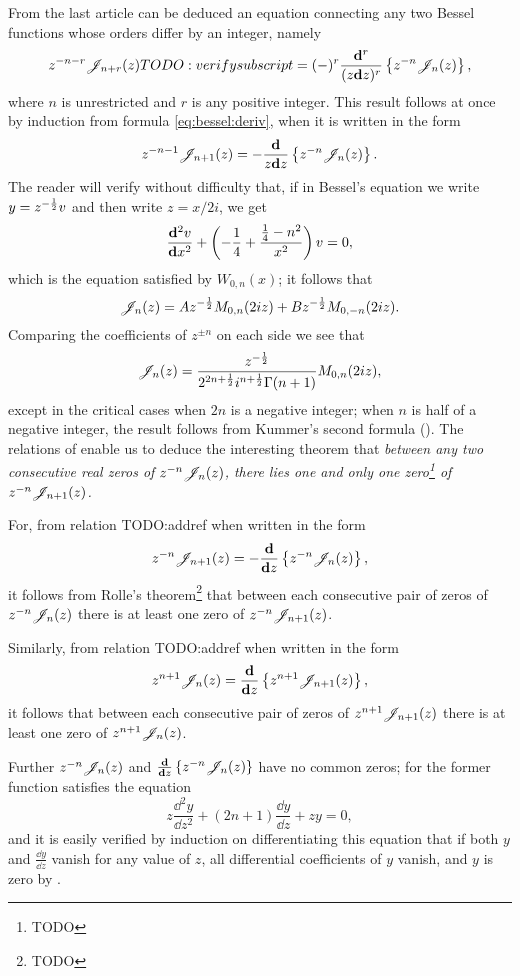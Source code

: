 From the last article can be deduced an equation connecting any two
Bessel functions whose orders differ by an integer, namely
$$
z^{-n-r} \mathscr{J}_{n+r}(z) TODO: verify subscript
=
(-)^{r}
\frac{\mathbf{d}^{r}}{ (z \mathbf{d} z)^{r} }
\left\{  z^{-n} \mathscr{J}_{n}(z)   \right\},
$$
where $n$ is unrestricted and $r$ is any positive integer. This result
follows at once by induction from formula \eqref{eq:bessel:deriv},
when it is written in the form
$$
z^{-n-1} \mathscr{J}_{n+1}(z)
=
- \frac{\mathbf{d}}{z \mathbf{d} z}
\left\{  z^{-n} \mathscr{J}_{n}(z)   \right\}.
$$
The reader will verify without difficulty that, if in Bessel's
equation we write $y = z^{-\frac{1}{2}} v$ and then write $z = x/2i$, we get
$$
\frac{\mathbf{d}^{2} v}{\mathbf{d} x^{2}}
+
\left(  -\frac{1}{4} + \frac{\frac{1}{4} - n^{2}}{x^{2}}   \right) v
=
0,
$$
which is the equation satisfied by $W_{0,n}(x)$; it follows that
$$
\mathscr{J}_{n}(z) = A z^{-\frac{1}{2}} M_{0,n}(2iz) + B z^{-\frac{1}{2}} M_{0,-n}(2iz).
$$
Comparing the coefficients of $z^{\pm n}$ on each side we see that
$$
\mathscr{J}_{n}(z) = \frac{z^{-\frac{1}{2}}}{2^{2n+\frac{1}{2}} i^{n+\frac{1}{2}} \Gamma(n+1)} M_{0,n}(2iz),
$$
%
%
except in the critical cases when $2n$ is a negative integer;
when $n$ is half of a negative integer, the result follows from
Kummer's second formula ().
The relations of  enable us to deduce the
interesting theorem that \emph{between any two consecutive real zeros
  of $z^{-n}\mathscr{J}_{n}(z)$, there lies one and only one zero\footnote{TODO}
  of $z^{-n}\mathscr{J}_{n+1}(z)$.}

For, from relation TODO:addref when written in the form
$$
z^{-n} \mathscr{J}_{n+1}(z)
=
- \frac{\mathbf{d}}{\mathbf{d} z} \left\{  z^{-n} \mathscr{J}_{n}(z)  \right\},
$$
it follows from Rolle's theorem\footnote{TODO} that between each
consecutive pair of zeros of $z^{-n}\mathscr{J}_{n}(z)$ there is at least one zero
of $z^{-n} \mathscr{J}_{n+1}(z)$.

Similarly, from relation TODO:addref when written in the form
$$
z^{n+1} \mathscr{J}_{n}(z)
=
\frac{\mathbf{d}}{\mathbf{d} z} \left\{  z^{n+1} \mathscr{J}_{n+1}(z)  \right\},
$$
it follows that between each consecutive pair of zeros of
$z^{n+1}\mathscr{J}_{n+1}(z)$ there is at least one zero of
$z^{n+1}\mathscr{J}_{n}(z)$.

Further $z^{-n}\mathscr{J}_{n}(z)$ and
$\frac{\mathbf{d}}{\mathbf{d} z} \left\{  z^{-n} \mathscr{J}_{n}(z)   \right\}$ have no common zeros; for
the former function satisfies the equation
$$
z \frac{\dd^{2} y}{\dd z^{2}} + (2n+1) \frac{\dd y}{\dd z} + zy = 0,
$$
and it is easily verified by induction on differentiating this
equation that if both $y$ and $\frac{\dd y}{\dd z}$ vanish for any value of
$z$, all differential coefficients of $y$ vanish, and $y$ is zero by
.

